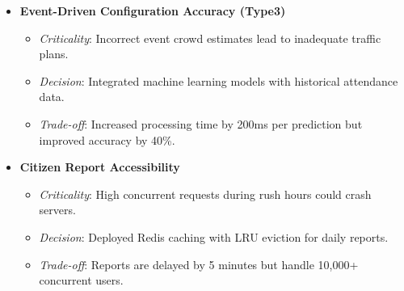 \documentclass[11.5pt]{article}
\begin{document}
\begin{itemize}
        \item \textbf{Event-Driven Configuration Accuracy (Type3)}
        \begin{itemize}
            \item \textit{Criticality}: Incorrect event crowd estimates lead to inadequate traffic plans.
            \item \textit{Decision}: Integrated machine learning models with historical attendance data.
            \item \textit{Trade-off}: Increased processing time by 200ms per prediction but improved accuracy by 40\%.
        \end{itemize}
        
        \item \textbf{Citizen Report Accessibility}
        \begin{itemize}
            \item \textit{Criticality}: High concurrent requests during rush hours could crash servers.
            \item \textit{Decision}: Deployed Redis caching with LRU eviction for daily reports.
            \item \textit{Trade-off}: Reports are delayed by 5 minutes but handle 10,000+ concurrent users.
        \end{itemize}
    \end{itemize}
    \clearpage
    \printbibliography
    [heading=bibintoc, title = {References}]
\end{document}
